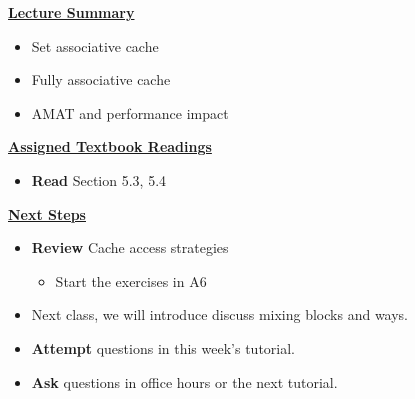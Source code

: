 

\begin{frame}[fragile]
 \underline{\textbf{Lecture Summary}}
 \begin{itemize}
\item Set associative cache
\item Fully associative cache
\item AMAT and performance impact
\end{itemize}

 \underline{\textbf{Assigned Textbook Readings}}
\begin{itemize}
   \item \textbf{Read} Section 5.3, 5.4
     \end{itemize}
    \underline{\textbf{Next Steps}}
    \begin{itemize}
     \item \textbf{Review} Cache access strategies 
\begin{itemize}
    \item Start the exercises in A6
\end{itemize}
\item Next class, we will introduce discuss mixing blocks and ways.
\item \textbf{Attempt} questions in this week's tutorial. 
    \item \textbf{Ask} questions in office hours or the next tutorial.
 \end{itemize}

\end{frame}